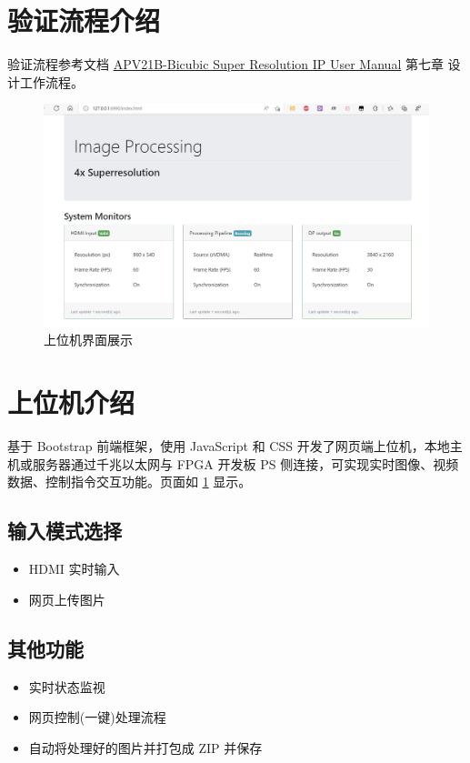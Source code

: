 \documentclass[12pt, a4paper, oneside]{ctexbook}
\begin{document}
    \section{验证流程介绍}
    验证流程参考文档 \href{../../00 IP User Manual (All Specs)/APV21B_Bicubic_Super_Resolution_IP_UM.pdf}{APV21B-Bicubic Super Resolution IP User Manual} 第七章 设计工作流程。
    \begin{figure}[t]
        \centering
        \includegraphics[scale=0.2]{pic/web.jpg}
        \caption{上位机界面展示}
        \label{web}
    \end{figure}
    \section{上位机介绍}
    基于 Bootstrap 前端框架，使用 JavaScript 和 CSS 开发了网页端上位机，本地主机或服务器通过千兆以太网与 FPGA 开发板 PS 侧连接，可实现实时图像、视频数据、控制指令交互功能。页面如 \ref{web} 显示。
    
    \newpage
    \subsection{输入模式选择}
    \begin{itemize}
        \item HDMI 实时输入
        \item 网页上传图片
    \end{itemize}
    \subsection{其他功能}
    \begin{itemize}
        \item 实时状态监视
        \item 网页控制(一键)处理流程
        \item 自动将处理好的图片并打包成 ZIP 并保存
    \end{itemize}

    
	
\end{document}
